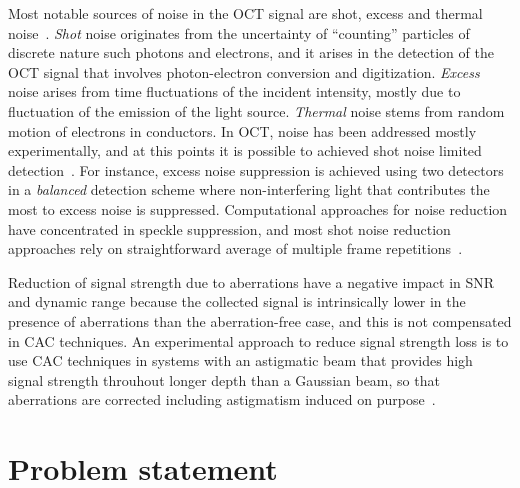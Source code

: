Most notable sources of noise in the OCT signal are shot, excess and thermal noise~\cite{deBoer2003_Improved}. \textit{Shot} noise originates from the uncertainty of ``counting'' particles of discrete nature such photons and electrons, and it arises in the detection of the OCT signal that involves photon-electron conversion and digitization. \textit{Excess} noise arises from time fluctuations of the incident intensity, mostly due to fluctuation of the emission of the light source. \textit{Thermal} noise stems from random motion of electrons in conductors. In OCT, noise has been addressed mostly experimentally, and at this points it is possible to achieved shot noise limited detection~\cite{deBoer2003_Improved}. For instance, excess noise suppression is achieved using two detectors in a \textit{balanced} detection scheme where non-interfering light that contributes the most to excess noise is suppressed. Computational approaches for noise reduction have concentrated in speckle suppression, and most shot noise reduction approaches rely on straightforward average of multiple frame repetitions~\cite{Baumann2019_Signal}.

Reduction of signal strength due to aberrations have a negative impact in SNR and dynamic range because the collected signal is intrinsically lower in the presence of aberrations than the aberration-free case, and this is not compensated in CAC techniques. An experimental approach to reduce signal strength loss is to use CAC techniques in systems with an astigmatic beam that provides high signal strength throuhout longer depth than a Gaussian beam, so that aberrations are corrected including astigmatism induced on purpose~\cite{Adie2012_Computational}.


\section{Problem statement}


